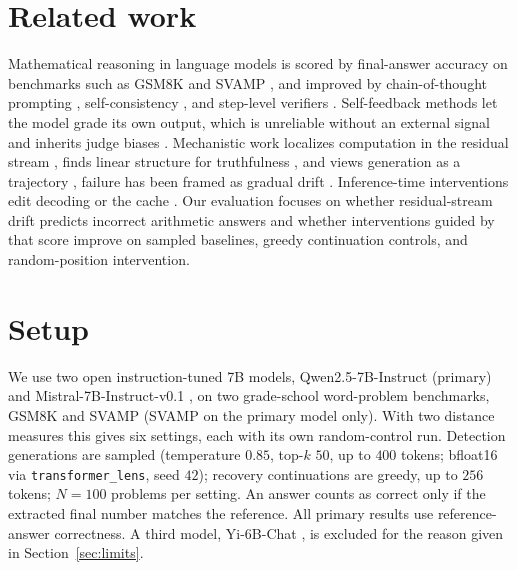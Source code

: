 \documentclass{article}
\begin{document}
\section{Related work}
\label{sec:related}
Mathematical reasoning in language models is scored by final-answer accuracy on benchmarks such as GSM8K \citep{cobbe2021gsm8k} and SVAMP \citep{patel2021svamp}, and improved by chain-of-thought prompting \citep{wei2022cot}, self-consistency \citep{wang2023selfconsistency}, and step-level verifiers \citep{lightman2023verify}. Self-feedback methods \citep{madaan2023selfrefine, shinn2023reflexion} let the model grade its own output, which is unreliable without an external signal \citep{huang2024cannot} and inherits judge biases \citep{zheng2023judging}. Mechanistic work localizes computation in the residual stream \citep{geva2021transformer, meng2022rome, belrose2023eliciting, bricken2023towards}, finds linear structure for truthfulness \citep{zou2023representation, marks2023geometry, azaria2023internal}, and views generation as a trajectory \citep{elhage2021mathematical, wang2022interpretability}, failure has been framed as gradual drift \citep{spataru2024know, halawi2024overthinking}. Inference-time interventions edit decoding or the cache \citep{chuang2023dola, zhang2024h2o, liu2024snapkv}. Our evaluation focuses on whether residual-stream drift predicts incorrect arithmetic answers and whether interventions guided by that score improve on sampled baselines, greedy continuation controls, and random-position intervention.

\section{Setup}
\label{sec:setup}

We use two open instruction-tuned 7B models, Qwen2.5-7B-Instruct \citep{qwen2024qwen25} (primary) and Mistral-7B-Instruct-v0.1 \citep{jiang2023mistral}, on two grade-school word-problem benchmarks, GSM8K \citep{cobbe2021gsm8k} and SVAMP \citep{patel2021svamp} (SVAMP on the primary model only). With two distance measures this gives six settings, each with its own random-control run. Detection generations are sampled (temperature $0.85$, top-$k$ $50$, up to $400$ tokens; bfloat16 via \texttt{transformer\_lens}, seed $42$); recovery continuations are greedy, up to $256$ tokens; $N{=}100$ problems per setting. An answer counts as correct only if the extracted final number matches the reference. All primary results use reference-answer correctness. A third model, Yi-6B-Chat \citep{ai2024yi}, is excluded for the reason given in Section~\ref{sec:limits}.
\end{document}
